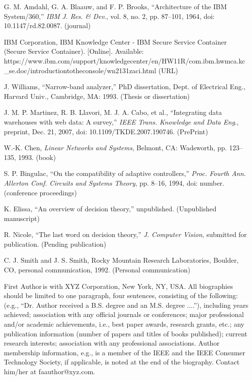 \documentclass{IEEEmce}
\begin{document}
\begin{thebibliography}{00}

 G. M. Amdahl, G. A. Blaauw, and F. P. Brooks, ``Architecture of the IBM System/360,'' {\it IBM J. Res. \& Dev}., vol. 8, no. 2, pp. 87--101, 1964, doi: 10.1147/rd.82.0087. (journal)

 IBM Corporation, IBM Knowledge Center - IBM Secure Service Container (Secure Service Container). [Online]. Available: {https://www.ibm.com/support/\break knowledgecenter/en/HW11R/com.ibm.hwmca.kc\_se.doc/\break introductiontotheconsole/wn2131zaci.html} (URL)

 J. Williams, ``Narrow-band analyzer,'' PhD dissertation, Dept. of Electrical Eng., Harvard Univ., Cambridge, MA: 1993. (Thesis or dissertation)

 J. M. P. Martinez, R. B. Llavori, M. J. A. Cabo, et al., ``Integrating data warehouses with web data: A survey,'' {\it IEEE Trans. Knowledge and Data Eng}., preprint, Dec. 21, 2007, doi: 10.1109/TKDE.2007.190746. (PrePrint)

 W.-K. Chen, {\it Linear Networks and Systems}, Belmont, CA: Wadsworth, pp. 123--135, 1993. (book)

 S. P. Bingulac, ``On the compatibility of adaptive controllers,'' {\it Proc. Fourth Ann. Allerton Conf. Circuits and Systems Theory}, pp. 8--16, 1994, doi: number. (conference proceedings)

 K. Elissa, ``An overview of decision theory,'' unpublished. (Unpublished manuscript)

 R. Nicole, ``The last word on decision theory,'' {\it J. Computer Vision}, submitted for publication. (Pending publication)

 C. J. Smith and J. S. Smith, Rocky Mountain Research Laboratories, Boulder, CO, personal communication, 1992. (Personal communication)
\end{thebibliography}%


\newpage

\begin{IEEEbiography}{First Author}{\,}is with XYZ Corporation, New York, NY, USA. All biographies should be limited to one paragraph, four sentences, consisting of the following: (e.g., ``Dr. Author received a B.S. degree and an M.S. degree $\ldots$.''), including years achieved; association with any official journals or conferences; major professional and/or academic achievements, i.e., best paper awards, research grants, etc.; any publication information (number of papers and titles of books published); current research interests; association with any professional associations. Author membership information, e.g., is a member of the IEEE and the IEEE Consumer Technology Society, if applicable, is noted at the end of the biography. Contact him/her at faauthor@xyz.com.
\end{IEEEbiography}
\end{document}
